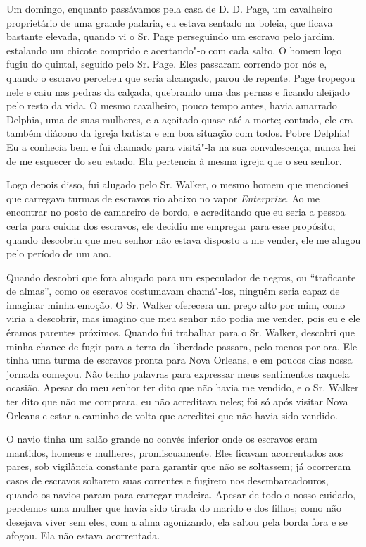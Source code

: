 Um domingo, enquanto passávamos pela casa de D. D. Page, um cavalheiro
proprietário de uma grande padaria, eu estava sentado na boleia, que
ficava bastante elevada, quando vi o Sr. Page perseguindo um escravo
pelo jardim, estalando um chicote comprido e acertando"-o com cada salto.
O homem logo fugiu do quintal, seguido pelo Sr. Page. Eles passaram
correndo por nós e, quando o escravo percebeu que seria alcançado, parou
de repente. Page tropeçou nele e caiu nas pedras da calçada, quebrando
uma das pernas e ficando aleijado pelo resto da vida. O mesmo
cavalheiro, pouco tempo antes, havia amarrado Delphia, uma de suas
mulheres, e a açoitado quase até a morte; contudo, ele era também
diácono da igreja batista e em boa situação com todos. Pobre Delphia! Eu
a conhecia bem e fui chamado para visitá"-la na sua convalescença; nunca
hei de me esquecer do seu estado. Ela pertencia à mesma igreja que o seu
senhor.

Logo depois disso, fui alugado pelo Sr. Walker, o mesmo homem que
mencionei que carregava turmas de escravos rio abaixo no vapor
\emph{Enterprize}. Ao me encontrar no posto de camareiro de bordo, e
acreditando que eu seria a pessoa certa para cuidar dos escravos, ele
decidiu me empregar para esse propósito; quando descobriu que meu senhor
não estava disposto a me vender, ele me alugou pelo período de um ano.

Quando descobri que fora alugado para um especulador de negros, ou
``traficante de almas'', como os escravos costumavam chamá"-los, ninguém
seria capaz de imaginar minha emoção. O Sr. Walker oferecera um preço
alto por mim, como viria a descobrir, mas imagino que meu senhor não
podia me vender, pois eu e ele éramos parentes próximos. Quando fui
trabalhar para o Sr. Walker, descobri que minha chance de fugir para a
terra da liberdade passara, pelo menos por ora. Ele tinha uma turma de
escravos pronta para Nova Orleans, e em poucos dias nossa jornada
começou. Não tenho palavras para expressar meus sentimentos naquela \label{ref6}
ocasião. Apesar do meu senhor ter dito que não havia me vendido, e o Sr.
Walker ter dito que não me comprara, eu não acreditava neles; foi só
após visitar Nova Orleans e estar a caminho de volta que acreditei que
não havia sido vendido.

O navio tinha um salão grande no convés inferior onde os escravos eram
mantidos, homens e mulheres, promiscuamente. Eles ficavam acorrentados
aos pares, sob vigilância constante para garantir que não se soltassem;
já ocorreram casos de escravos soltarem suas correntes e fugirem nos
desembarcadouros, quando os navios param para carregar madeira. Apesar
de todo o nosso cuidado, perdemos uma mulher que havia sido tirada do
marido e dos filhos; como não desejava viver sem eles, com a alma
agonizando, ela saltou pela borda fora e se afogou. Ela não estava
acorrentada.

